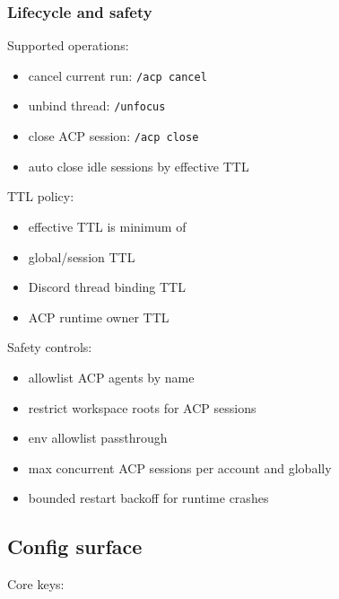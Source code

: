 \subsubsection{Lifecycle and safety}


Supported operations:

\begin{itemize}
  \item cancel current run: \texttt{/acp cancel}
  \item unbind thread: \texttt{/unfocus}
  \item close ACP session: \texttt{/acp close}
  \item auto close idle sessions by effective TTL
\end{itemize}


TTL policy:

\begin{itemize}
  \item effective TTL is minimum of
  \item global/session TTL
  \item Discord thread binding TTL
  \item ACP runtime owner TTL
\end{itemize}


Safety controls:

\begin{itemize}
  \item allowlist ACP agents by name
  \item restrict workspace roots for ACP sessions
  \item env allowlist passthrough
  \item max concurrent ACP sessions per account and globally
  \item bounded restart backoff for runtime crashes
\end{itemize}


\subsection{Config surface}


Core keys:

